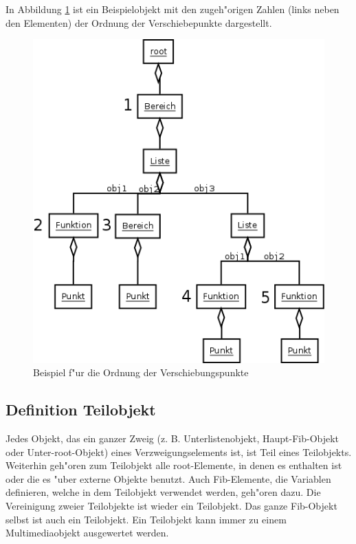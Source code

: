 In Abbildung \ref{figOrderMovePoints} ist ein Beispielobjekt mit den zugeh"origen Zahlen (links neben den Elementen) der Ordnung der Verschiebepunkte dargestellt.

\begin{figure}[htbp]
\begin{center}
  \includegraphics[scale=0.5]{order_move_points}
\end{center}
\caption{Beispiel f"ur die Ordnung der Verschiebungspunkte}
\label{figOrderMovePoints}
\end{figure}


\subsection{Definition Teilobjekt}

Jedes Objekt, das ein ganzer Zweig (z. B. Unterlistenobjekt, Haupt-Fib-Objekt oder Unter-root-Objekt) eines Verzweigungselements ist, ist Teil eines Teilobjekts. Weiterhin geh"oren zum Teilobjekt alle root-Elemente, in denen es enthalten ist oder die es "uber externe Objekte benutzt. Auch Fib-Elemente, die Variablen definieren, welche in dem Teilobjekt verwendet werden, geh"oren dazu.
Die Vereinigung zweier Teilobjekte ist wieder ein Teilobjekt.
Das ganze Fib-Objekt selbst ist auch ein Teilobjekt.
Ein Teilobjekt kann immer zu einem Multimediaobjekt ausgewertet werden.

